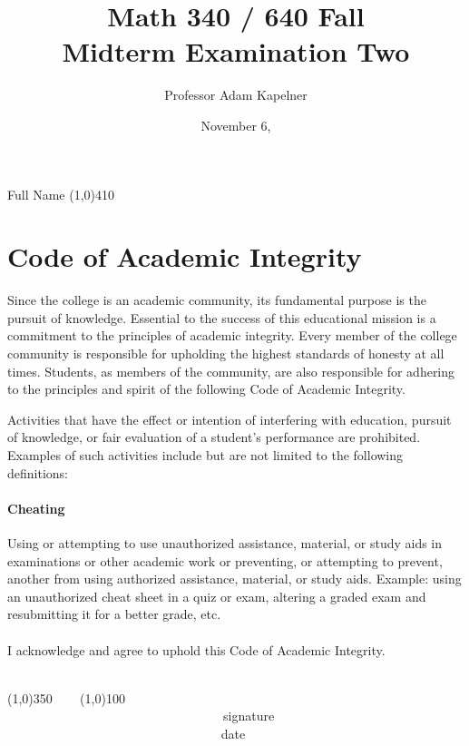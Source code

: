 \documentclass[12pt]{article}
\title{Math 340 / 640 Fall \the\year{} \\ Midterm Examination Two \inred{Solutions}}
\author{Professor Adam Kapelner}
\date{November 6, \the\year{}}
\begin{document}
\maketitle

\noindent Full Name \line(1,0){410}

\thispagestyle{empty}

\section*{Code of Academic Integrity}

\footnotesize
Since the college is an academic community, its fundamental purpose is the pursuit of knowledge. Essential to the success of this educational mission is a commitment to the principles of academic integrity. Every member of the college community is responsible for upholding the highest standards of honesty at all times. Students, as members of the community, are also responsible for adhering to the principles and spirit of the following Code of Academic Integrity.

Activities that have the effect or intention of interfering with education, pursuit of knowledge, or fair evaluation of a student's performance are prohibited. Examples of such activities include but are not limited to the following definitions:

\paragraph{Cheating} Using or attempting to use unauthorized assistance, material, or study aids in examinations or other academic work or preventing, or attempting to prevent, another from using authorized assistance, material, or study aids. Example: using an unauthorized cheat sheet in a quiz or exam, altering a graded exam and resubmitting it for a better grade, etc.\\
\\
\noindent I acknowledge and agree to uphold this Code of Academic Integrity. \\~\\

\begin{center}
\line(1,0){350} ~~~ \line(1,0){100}\\
~~~~~~~~~~~~~~~~~~~~~~~~~~~~~~~~~~signature~~~~~~~~~~~~~~~~~~~~~~~~~~~~~~~~~~~~~~~~~~~~~~~~~~~~~~~~~~~~~~ date
\end{center}

\normalsize
\end{document}
